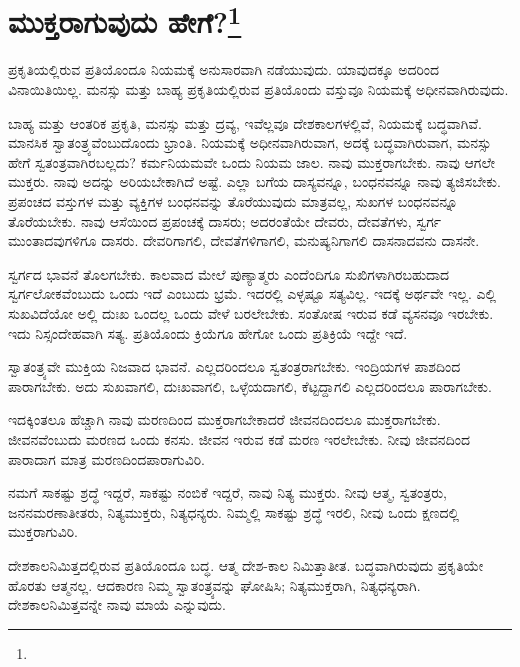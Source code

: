 
\vspace{-0.6cm}

\chapter[ಮುಕ್ತರಾಗುವುದು ಹೇಗೆ?]{ಮುಕ್ತರಾಗುವುದು ಹೇಗೆ?\protect\footnote{}}

ಪ್ರಕೃತಿಯಲ್ಲಿರುವ ಪ್ರತಿಯೊಂದೂ ನಿಯಮಕ್ಕೆ ಅನುಸಾರವಾಗಿ ನಡೆಯುವುದು. ಯಾವುದಕ್ಕೂ ಅದರಿಂದ ವಿನಾಯಿತಿಯಿಲ್ಲ. ಮನಸ್ಸು ಮತ್ತು ಬಾಹ್ಯ ಪ್ರಕೃತಿಯಲ್ಲಿರುವ ಪ್ರತಿಯೊಂದು ವಸ್ತುವೂ ನಿಯಮಕ್ಕೆ ಅಧೀನವಾಗಿರುವುದು. 

\eject

ಬಾಹ್ಯ ಮತ್ತು ಆಂತರಿಕ ಪ್ರಕೃತಿ, ಮನಸ್ಸು ಮತ್ತು ದ್ರವ್ಯ, ಇವೆಲ್ಲವೂ ದೇಶ\break ಕಾಲಗಳಲ್ಲಿವೆ, ನಿಯಮಕ್ಕೆ ಬದ್ಧವಾಗಿವೆ. ಮಾನಸಿಕ ಸ್ವಾತಂತ್ರ್ಯವೆಂಬುದೊಂದು ಭ್ರಾಂತಿ. ನಿಯಮಕ್ಕೆ ಅಧೀನವಾಗಿರುವಾಗ, ಅದಕ್ಕೆ ಬದ್ಧವಾಗಿರುವಾಗ, ಮನಸ್ಸು ಹೇಗೆ ಸ್ವತಂತ್ರವಾಗಿರಬಲ್ಲದು? ಕರ್ಮನಿಯಮವೇ ಒಂದು ನಿಯಮ ಜಾಲ. ನಾವು ಮುಕ್ತರಾಗಬೇಕು. ನಾವು ಆಗಲೇ ಮುಕ್ತರು. ನಾವು ಅದನ್ನು ಅರಿಯಬೇಕಾಗಿದೆ ಅಷ್ಟೆ. ಎಲ್ಲಾ ಬಗೆಯ ದಾಸ್ಯವನ್ನೂ, ಬಂಧನವನ್ನೂ ನಾವು ತ್ಯಜಿಸಬೇಕು. ಪ್ರಪಂಚದ ವಸ್ತುಗಳ ಮತ್ತು ವ್ಯಕ್ತಿಗಳ ಬಂಧನವನ್ನು ತೊರೆಯುವುದು ಮಾತ್ರವಲ್ಲ, ಸುಖಗಳ ಬಂಧನವನ್ನೂ ತೊರೆಯಬೇಕು. ನಾವು ಆಸೆಯಿಂದ ಪ್ರಪಂಚಕ್ಕೆ ದಾಸರು; ಅದರಂತೆಯೇ ದೇವರು, ದೇವತೆಗಳು, ಸ್ವರ್ಗ ಮುಂತಾದವುಗಳಿಗೂ ದಾಸರು. ದೇವರಿಗಾಗಲಿ, ದೇವತೆಗಳಿಗಾಗಲಿ, ಮನುಷ್ಯನಿಗಾಗಲಿ ದಾಸನಾದವನು ದಾಸನೇ.

\vskip 0.1cm

ಸ್ವರ್ಗದ ಭಾವನೆ ತೊಲಗಬೇಕು. ಕಾಲವಾದ ಮೇಲೆ ಪುಣ್ಯಾತ್ಮರು ಎಂದೆಂದಿಗೂ ಸುಖಿಗಳಾಗಿರಬಹುದಾದ ಸ್ವರ್ಗಲೋಕವೆಂಬುದು ಒಂದು ಇದೆ ಎಂಬುದು ಭ್ರಮೆ. ಇದರಲ್ಲಿ ಎಳ್ಳಷ್ಟೂ ಸತ್ಯವಿಲ್ಲ. ಇದಕ್ಕೆ ಅರ್ಥವೇ ಇಲ್ಲ. ಎಲ್ಲಿ ಸುಖವಿದೆಯೋ ಅಲ್ಲಿ ದುಃಖ ಒಂದಲ್ಲ ಒಂದು ವೇಳೆ ಬರಲೇಬೇಕು. ಸಂತೋಷ ಇರುವ ಕಡೆ ವ್ಯಸನವೂ ಇರಬೇಕು. ಇದು ನಿಸ್ಸಂದೇಹವಾಗಿ ಸತ್ಯ. ಪ್ರತಿಯೊಂದು ಕ್ರಿಯೆಗೂ ಹೇಗೋ ಒಂದು ಪ್ರತಿಕ್ರಿಯೆ ಇದ್ದೇ ಇದೆ.

\vskip 0.1cm

ಸ್ವಾತಂತ್ರ್ಯವೇ ಮುಕ್ತಿಯ ನಿಜವಾದ ಭಾವನೆ. ಎಲ್ಲದರಿಂದಲೂ ಸ್ವತಂತ್ರರಾಗಬೇಕು. ಇಂದ್ರಿಯಗಳ ಪಾಶದಿಂದ ಪಾರಾಗಬೇಕು. ಅದು ಸುಖವಾಗಲಿ, ದುಃಖವಾಗಲಿ, ಒಳ್ಳೆಯದಾಗಲಿ, ಕೆಟ್ಟದ್ದಾಗಲಿ ಎಲ್ಲದರಿಂದಲೂ ಪಾರಾಗಬೇಕು.

\vskip 0.1cm

ಇದಕ್ಕಿಂತಲೂ ಹೆಚ್ಚಾಗಿ ನಾವು ಮರಣದಿಂದ ಮುಕ್ತರಾಗಬೇಕಾದರೆ ಜೀವನದಿಂದಲೂ ಮುಕ್ತರಾಗಬೇಕು. ಜೀವನವೆಂಬುದು ಮರಣದ ಒಂದು ಕನಸು. ಜೀವನ ಇರುವ ಕಡೆ ಮರಣ ಇರಲೇಬೇಕು. ನೀವು ಜೀವನದಿಂದ ಪಾರಾದಾಗ ಮಾತ್ರ ಮರಣದಿಂದ\break ಪಾರಾಗುವಿರಿ.

\vskip 0.1cm

ನಮಗೆ ಸಾಕಷ್ಟು ಶ್ರದ್ಧೆ ಇದ್ದರೆ, ಸಾಕಷ್ಟು ನಂಬಿಕೆ ಇದ್ದರೆ, ನಾವು ನಿತ್ಯ ಮುಕ್ತರು. ನೀವು ಆತ್ಮ, ಸ್ವತಂತ್ರರು, ಜನನಮರಣಾತೀತರು, ನಿತ್ಯಮುಕ್ತರು, ನಿತ್ಯಧನ್ಯರು. ನಿಮ್ಮಲ್ಲಿ ಸಾಕಷ್ಟು ಶ್ರದ್ಧೆ ಇರಲಿ, ನೀವು ಒಂದು ಕ್ಷಣದಲ್ಲಿ ಮುಕ್ತರಾಗುವಿರಿ.

\vskip 0.1cm

ದೇಶಕಾಲನಿಮಿತ್ತದಲ್ಲಿರುವ ಪ್ರತಿಯೊಂದೂ ಬದ್ಧ. ಆತ್ಮ ದೇಶ-ಕಾಲ ನಿಮಿತ್ತಾತೀತ. ಬದ್ಧವಾಗಿರುವುದು ಪ್ರಕೃತಿಯೇ ಹೊರತು ಆತ್ಮನಲ್ಲ. ಆದಕಾರಣ ನಿಮ್ಮ ಸ್ವಾತಂತ್ರ್ಯವನ್ನು ಘೋಷಿಸಿ; ನಿತ್ಯಮುಕ್ತರಾಗಿ, ನಿತ್ಯಧನ್ಯರಾಗಿ. ದೇಶಕಾಲನಿಮಿತ್ತವನ್ನೇ ನಾವು ಮಾಯೆ ಎನ್ನುವುದು.

